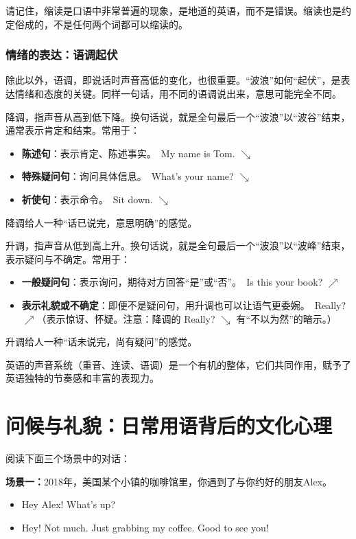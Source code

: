 \documentclass[10.5pt, a4paper]{ctexbook} %
\begin{document}
请记住，缩读是口语中非常普遍的现象，是地道的英语，而不是错误。缩读也是约定俗成的，不是任何两个词都可以缩读的。

\subsubsection*{情绪的表达：语调起伏}

除此以外，语调，即说话时声音高低的变化，也很重要。“波浪”如何“起伏”，是表达情绪和态度的关键。同样一句话，用不同的语调说出来，意思可能完全不同。

降调，指声音从高到低下降。换句话说，就是全句最后一个“波浪”以“波谷”结束，通常表示肯定和结束。常用于：
\begin{itemize}
\item \textbf{陈述句}：表示肯定、陈述事实。\ My name is Tom. $\searrow$
\item \textbf{特殊疑问句}：询问具体信息。\ What's your name? $\searrow$
\item \textbf{祈使句}：表示命令。\ Sit down. $\searrow$
\end{itemize}

降调给人一种“话已说完，意思明确”的感觉。

升调，指声音从低到高上升。换句话说，就是全句最后一个“波浪”以“波峰”结束，表示疑问与不确定。常用于：
\begin{itemize}
\item \textbf{一般疑问句}：表示询问，期待对方回答“是”或“否”。\ Is this your book? $\nearrow$
\item \textbf{表示礼貌或不确定}：即便不是疑问句，用升调也可以让语气更委婉。\ Really? $\nearrow$（表示惊讶、怀疑。注意：降调的 Really? $\searrow$ 有“不以为然”的暗示。）
\end{itemize}

升调给人一种“话未说完，尚有疑问”的感觉。

英语的声音系统（重音、连读、语调）是一个有机的整体，它们共同作用，赋予了英语独特的节奏感和丰富的表现力。

\section{问候与礼貌：日常用语背后的文化心理}

阅读下面三个场景中的对话：

\textbf{场景一：}2018年，美国某个小镇的咖啡馆里，你遇到了与你约好的朋友Alex。
\begin{center}
    \begin{minipage}{0.6\linewidth}
    \centering
        \begin{itemize}
            \item[你：] Hey Alex! What's up? 
            \item[Alex：] Hey! Not much. Just grabbing my coffee. Good to see you!
        \end{itemize}
    \end{minipage}
\end{center}
\end{document}

